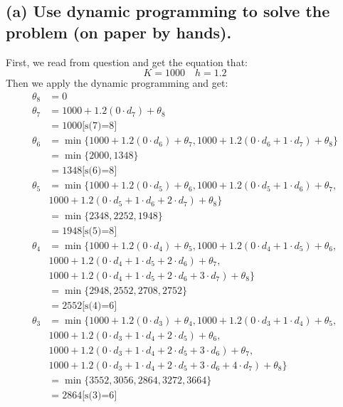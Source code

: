 \documentclass[a4paper,12pt]{journal}
\begin{document}
	\subsection*{(a) Use dynamic programming to solve the problem (on paper by hands).}
	First, we read from question and get the equation that:\\
	\begin{equation}
		K=1000\quad h=1.2
	\end{equation}
	Then we apply the dynamic programming and get:\\
	\begin{equation}
		\begin{aligned}
			\theta_8&=0\\
			\theta_7&=1000+1.2(0\cdot d_7)+\theta_8\\
			&=1000\text{[s(7)=8]}\\
			\theta_6&=\min\{1000+1.2(0\cdot d_6)+\theta_7,1000+1.2(0\cdot d_6+1\cdot d_7)+\theta_8\}\\
			&=\min\{2000,1348\}\\
			&=1348\text{[s(6)=8]}\\
			\theta_5&=\min\{1000+1.2(0\cdot d_5)+\theta_6,1000+1.2(0\cdot d_5+1\cdot d_6)+\theta_7,\\
			&1000+1.2(0\cdot d_5+1\cdot d_6+2\cdot d_7)+\theta_8\}\\
			&=\min\{2348,2252,1948\}\\
			&=1948\text{[s(5)=8]}\\
			\theta_4&=\min\{1000+1.2(0\cdot d_4)+\theta_5,1000+1.2(0\cdot d_4+1\cdot d_5)+\theta_6,\\
			&1000+1.2(0\cdot d_4+1\cdot d_5+2\cdot d_6)+\theta_7,\\
			& 1000+1.2(0\cdot d_4+1\cdot d_5+2\cdot d_6+3
		\cdot d_7)+\theta_8\}\\
			&=\min\{2948,2552,2708,2752\}\\
			&=2552\text{[s(4)=6]}\\
			\theta_3&=\min\{1000+1.2(0\cdot d_3)+\theta_4,1000+1.2(0\cdot d_3+1\cdot d_4)+\theta_5,\\
			&1000+1.2(0\cdot d_3+1\cdot d_4+2\cdot d_5)+\theta_6,\\
			& 1000+1.2(0\cdot d_3+1\cdot d_4+2\cdot d_5+3
			\cdot d_6)+\theta_7,\\
			&1000+1.2(0\cdot d_3+1\cdot d_4+2\cdot d_5+3
			\cdot d_6+4\cdot d_7)+\theta_8\}\\
			&=\min\{3552,3056,2864,3272,3664\}\\
			&=2864\text{[s(3)=6]}\\

\end{aligned}
\end{equation}
\end{document}
